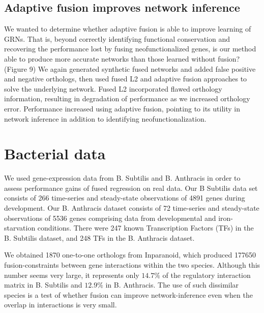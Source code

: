 \documentclass[11pt]{article}
\begin{document}
\subsection{Adaptive fusion improves network inference}
We wanted to determine whether adaptive fusion is able to improve learning of GRNs. That is, beyond correctly identifying functional conservation and recovering the performance lost by fusing neofunctionalized genes, is our method able to produce more accurate networks than those learned without fusion? (Figure 9) We again generated synthetic fused networks and added false positive and negative orthologs, then used fused L2 and adaptive fusion approaches to solve the underlying network. Fused L2 incorporated flawed orthology information, resulting in degradation of performance as we increased orthology error. Performance increased using adaptive fusion, pointing to its utility in network inference in addition to identifying neofunctionalization.


\section{Bacterial data}
We used gene-expression data from B. Subtilis and B. Anthracis in order to assess performance gains of fused regression on real data. Our B Subtilis data set consists of 266 time-series and steady-state observations of 4891 genes during development. Our B. Anthracis dataset consists of 72 time-series and steady-state observations of 5536 genes comprising data from developmental and iron-starvation conditions. There were 247 known Transcription Factors (TFs) in the B. Subtilis dataset, and 248 TFs in the B. Anthracis dataset. 

We obtained 1870 one-to-one orthologs from Inparanoid, which produced 177650 fusion-constraints between gene interactions within the two species. Although this number seems very large, it represents only $14.7\%$ of the regulatory interaction matrix in B. Subtilis and $12.9\%$ in B. Anthracis. The use of such dissimilar species is a test of whether fusion can improve network-inference even when the overlap in interactions is very small.
\end{document}
